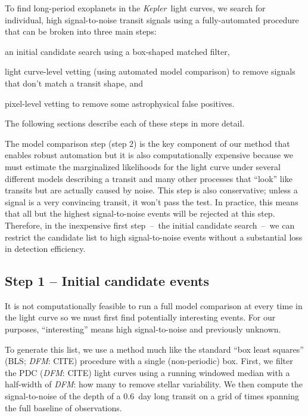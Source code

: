 \documentclass[manuscript, letterpaper]{aastex6}
\newcommand{\project}[1]{\textsl{#1}}
\newcommand{\kepler}{\project{Kepler}}
\newcommand{\todo}[3]{{\color{#2}\emph{#1}: #3}}
\newcommand{\dfmtodo}[1]{\todo{DFM}{red}{#1}}
\begin{document}
To find long-period exoplanets in the \kepler\ light curves, we search for
individual, high signal-to-noise transit signals using a fully-automated
procedure that can be broken into three main steps:
\begin{enumerate}
{\item an initial candidate search using a box-shaped matched filter,}
{\item light curve-level vetting (using automated model comparison) to remove
signals that don't match a transit shape, and}
{\item pixel-level vetting to remove some astrophysical false positives.}
\end{enumerate}
The following sections describe each of these steps in more detail.

The model comparison step (step 2) is the key component of our method that
enables robust automation but it is also computationally expensive because we
must estimate the marginalized likelihoods for the light curve under several
different models describing a transit and many other processes that ``look''
like transits but are actually caused by noise.
This step is also conservative; unless a signal is a very convincing transit,
it won't pass the test.
In practice, this means that all but the highest signal-to-noise events will
be rejected at this step.
Therefore, in the inexpensive first step~--~the initial candidate search~--~we
can restrict the candidate list to high signal-to-noise events without a
substantial loss in detection efficiency.

\subsection{Step 1 -- Initial candidate events}

It is not computationally feasible to run a full model comparison at every
time in the light curve so we must first find potentially interesting events.
For our purposes, ``interesting'' means high signal-to-noise and previously
unknown.

To generate this list, we use a method much like the standard ``box least
squares'' (BLS; \dfmtodo{CITE}) procedure with a single (non-periodic) box.
First, we filter the PDC (\dfmtodo{CITE}) light curves using a running
windowed median with a half-width of \dfmtodo{how many} to remove stellar
variability.
We then compute the signal-to-noise of the depth of a 0.6~day long
transit on a grid of times spanning the full baseline of observations.
\end{document}
